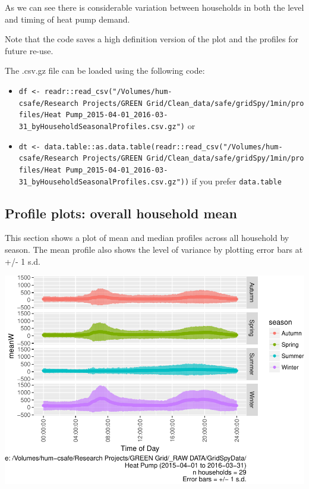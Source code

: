 \documentclass[]{article}
\providecommand{\tightlist}{%
  \setlength{\itemsep}{0pt}\setlength{\parskip}{0pt}}
\begin{document}
As we can see there is considerable variation between households in both
the level and timing of heat pump demand.

Note that the code saves a high definition version of the plot and the
profiles for future re-use.

The .csv.gz file can be loaded using the following code:

\begin{itemize}
\tightlist
\item
  \texttt{df\ \textless{}-\ readr::read\_csv("/Volumes/hum-csafe/Research\ Projects/GREEN\ Grid/Clean\_data/safe/gridSpy/1min/profiles/Heat\ Pump\_2015-04-01\_2016-03-31\_byHouseholdSeasonalProfiles.csv.gz")}
  or
\item
  \texttt{dt\ \textless{}-\ data.table::as.data.table(readr::read\_csv("/Volumes/hum-csafe/Research\ Projects/GREEN\ Grid/Clean\_data/safe/gridSpy/1min/profiles/Heat\ Pump\_2015-04-01\_2016-03-31\_byHouseholdSeasonalProfiles.csv.gz"))}
  if you prefer \texttt{data.table}
\end{itemize}

\subsection{Profile plots: overall household
mean}\label{profile-plots-overall-household-mean}

This section shows a plot of mean and median profiles across all
household by season. The mean profile also shows the level of variance
by plotting error bars at +/- 1 s.d.

\includegraphics{nzGGHouseholdPowerDemandProfile_Heat Pump_2015-04-01_2016-03-31_files/figure-latex/overall profiles by season-1.pdf}
\end{document}
